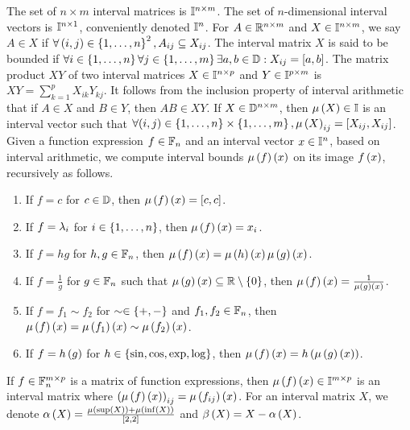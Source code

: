 The set of $n\times m$ interval matrices is $\mathbb{I}^{n\times m}$.
The set of $n$-dimensional interval vectors is $\mathbb{I}^{n\times
1}$, conveniently denoted $\mathbb{I}^{n}$.  For $A\in\mathbb{R}^{n\times
m}$ and $X\in\mathbb{I}^{n\times m}$, we say $A\in X$ if
$\forall \left(i,j\right)\in\left\{1,\ldots,n\right\}^2, A_{ij}\subseteq X_{ij}$.  The
interval matrix $X$ is said to be bounded if $\forall
i\in\left\{1,\ldots,n\right\}\forall j\in\left\{1,\ldots,m\right\} \exists
a,b\in\mathbb{D}: X_{ij} = [a,b]$.  The matrix product $XY$ of two
interval matrices $X\in\mathbb{I}^{n\times p}$ and
$Y\in\mathbb{I}^{p\times m}$ is $XY = \sum_{k=1}^pX_{ik}Y_{kj}$.  It
follows from the inclusion property of interval arithmetic that if
$A\in X$ and $B\in Y$, then $AB\in XY$.  If $X\in\mathbb{D}^{n\times m}$,
then $\mu\left(X\right)\in\mathbb{I}$ is an interval vector such that $\forall
(i,j)\in\left\{1,\ldots,n\right\}\times\left\{1,\ldots,m\right\},\mu\left(X\right)_{ij} =
[X_{ij},X_{ij}]$.  Given a function expression $f\in\mathbb{F}_{n}$ and an
interval vector $x\in\mathbb{I}^n$, based on interval arithmetic, we
compute interval bounds $\mu\left(f\right)\left(x\right)$ on its image $f\left(x\right)$,
recursively as follows.
%
\begin{enumerate}
\item If $f = c$ for $c\in\mathbb{D}$, then $\mu\left(f\right)\left(x\right) = [c,c]$.
\item If $f = \lambda_{i}$ for $i\in\left\{1,\ldots,n\right\}$, then $\mu\left(f\right)\left(x\right) =
x_i$.
\item If $f = hg$ for $h,g\in\mathbb{F}_{n}$, then $\mu\left(f\right)\left(x\right)
= \mu\left(h\right)\left(x\right)\mu\left(g\right)\left(x\right)$.
\item If $f = \frac{1}{g}$ for $g\in\mathbb{F}_{n}$ such that
$\mu\left(g\right)\left(x\right)\subseteq\mathbb{R}\setminus \left\{0\right\}$, then $\mu\left(f\right)\left(x\right)
= \frac{1}{\mu\left(g\right)\left(x\right)}$.
\item If $f = f_1\sim f_2$ for $\sim\in\left\{+,-\right\}$ and
$f_1,f_2\in\mathbb{F}_{n}$, then $\mu\left(f\right)\left(x\right) = \mu\left(f_1\right)\left(x\right)\sim\mu\left(f_2\right)\left(x\right)$.
\item If $f = h\left(g\right)$ for $h\in\left\{\sin, \cos, \exp, \log\right\}$, then
$\mu\left(f\right)\left(x\right) = h\left(\mu\left(g\right)\left(x\right)\right)$.
\end{enumerate}
%
If $f\in\mathbb{F}_{n}^{m\times p}$ is a matrix of function expressions, then
$\mu\left(f\right)\left(x\right)\in \mathbb{I}^{m\times p}$ is an interval matrix where
$\left(\mu\left(f\right)\left(x\right)\right)_{ij} = \mu\left(f_{ij}\right)\left(x\right)$.  For an interval matrix $X$,
we denote $\alpha\left(X\right) = \frac{\mu\left(\sup\left(X\right)\right) + \mu\left(\inf\left(X\right)\right)}{[2,2]}$ and
$\beta\left(X\right) = X - \alpha\left(X\right)$.  
%

